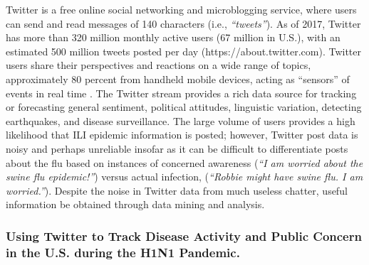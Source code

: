 \documentclass[sigconf]{acmart}
\begin{document}
Twitter is a free online social networking and microblogging service, where users can send 
and read messages of 140 characters (i.e., {\it ``tweets''}). As of 2017, Twitter has more 
than 320 million monthly active users (67 million in U.S.), with an estimated 500 million 
tweets posted per day (https://about.twitter.com). Twitter users share their perspectives and
reactions on a wide range of topics, approximately 80 percent from handheld mobile devices, 
acting as ``sensors'' of events in real time \cite{achrekar12}. The Twitter stream provides 
a rich data source for tracking or forecasting general sentiment, political attitudes, 
linguistic variation, detecting earthquakes, and disease surveillance. The large volume of 
users provides a high likelihood that ILI epidemic information is posted; however, Twitter 
post data is noisy and perhaps unreliable insofar as it can be difficult to differentiate 
posts about the flu based on instances of concerned awareness ({\it ``I am worried about 
the swine flu epidemic!''}) versus actual infection, ({\it ``Robbie might have swine flu. 
I am worried.''})\cite{lamb13}. Despite the noise in Twitter data from much useless chatter, 
useful information be obtained through data mining and analysis. 

\subsubsection{Using Twitter to Track Disease Activity and Public Concern in the 
U.S. during the H1N1 Pandemic.}
\end{document}
